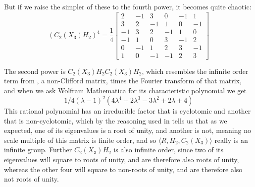 But if we raise the simpler of these to the fourth power, it becomes quite chaotic:
\[\left(C_2(X_3)H_2\right)^4 =
\frac{1}{4}
\begin{bmatrix}
	2&-1&3&0&-1&1\\ 
	3&2&-1&1&0&-1\\ 
	-1&3&2&-1&1&0\\ 
	-1&1&0&3&-1&2\\ 
	0&-1&1&2&3&-1\\ 
	1&0&-1&-1&2&3
\end{bmatrix}
\]

The second power is $C_2(X_3)H_2C_2(X_3)H_2$, which resembles the infinite order term from \cite{universal-qubit}, a non-Clifford matrix, times the Fourier transform of that matrix, and when we ask Wolfram Mathematica for its characteristic polynomial we get
\[1/4 (\lambda - 1)^2 (4 \lambda^4 + 2 \lambda^3 - 3 \lambda^2 + 2 \lambda + 4)\]
This rational polynomial has an irreducible factor that is cyclotomic and another that is non-cyclotomic, which by the reasoning used in \cite{universal-qubit} tells us that as we expected, one of its eigenvalues is a root of unity, and another is not, meaning no scale multiple of this matrix is finite order, and so $\langle R, H_2, C_2(X_3) \rangle$ really is an infinite group. Further $C_2(X_3)H_2$ is also infinite order, since two of its eigenvalues will square to roots of unity, and are therefore also roots of unity, whereas the other four will square to non-roots of unity, and are therefore also not roots of unity.

